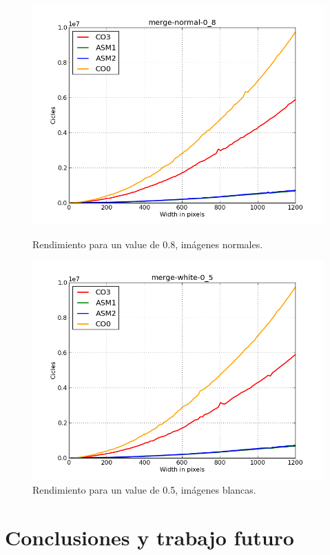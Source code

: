 \documentclass[a4paper]{article}
\begin{document}
\begin{figure}[H]
	\begin{center}
		\includegraphics[scale=0.4]{../tp2-bundle.v2/Testing/plots/all/merge-normal-08--all.png}
		\caption{Rendimiento para un value de 0.8, imágenes normales.}
		\label{fig:exp1-0.5}
	\end{center}
	\endminipage\hfill
	\begin{center}
		\includegraphics[scale=0.4]{../tp2-bundle.v2/Testing/plots/all/merge-white-05--all.png}
		\caption{Rendimiento para un value de 0.5, imágenes blancas.}
		\label{fig:exp1-0.5}
	\end{center}
	\endminipage\hfill
\end{figure}











\section{Conclusiones y trabajo futuro}
\end{document}
